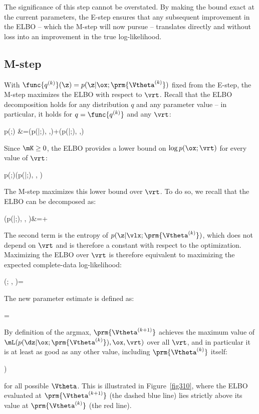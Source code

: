 The significance of this step cannot be overstated. By making the bound exact at the current parameters, the E-step ensures that any subsequent improvement in the ELBO -- which the M-step will now pursue -- translates directly and without loss into an improvement in the true log-likelihood.

\subsection*{M-step}

With $\func{q^{(k)}}(\z) = p(\z|\ox;\prm{\Vtheta^{(k)}})$ fixed from the E-step, the M-step maximizes the ELBO with respect to $\vrt$. Recall that the ELBO decomposition holds for any distribution $q$ and any parameter value -- in particular, it holds for $q = \func{q^{(k)}}$ and any $\vrt$:
\begin{myalign}
\log p(\ox ;\vrt)
&=\mL(p(\dz|\ox ;), \ox,\vrt)+\mK(p(\dz|\ox ;{}), \ox ,\vrt)
\end{myalign}
Since $\mK \geq 0$, the ELBO provides a lower bound on $\log p(\ox;\vrt)$ for every value of $\vrt$:
\begin{myequation}
\log p(\ox ;\vrt)\geq\mL(p(\dz|\ox ;{}), \ox, \vrt)
\end{myequation}
The M-step maximizes this lower bound over $\vrt$. To do so, we recall that the ELBO can be decomposed as:
\begin{myalign}
  \mL(p(\dz|\vlx ;), \vlx, \vrt)&=+
\end{myalign}
The second term is the entropy of $p(\z|\vlx;\prm{\Vtheta^{(k)}})$, which does not depend on $\vrt$ and is therefore a constant with respect to the optimization. Maximizing the ELBO over $\vrt$ is therefore equivalent to maximizing the expected complete-data log-likelihood:
\begin{myequation}
 (\vrt; {}, \vlx)=
\end{myequation}
The new parameter estimate is defined as:
\begin{myequation}
=
\end{myequation}
By definition of the argmax, $\prm{\Vtheta^{(k+1)}}$ achieves the maximum value of $\mL(p(\dz|\ox;\prm{\Vtheta^{(k)}}),\ox,\vrt)$ over all $\vrt$, and in particular it is at least as good as any other value, including $\prm{\Vtheta^{(k)}}$ itself:
\begin{myequation}
{)} 
\end{myequation}
for all possible $\Vtheta$. This is illustrated in Figure~\ref{fig310}, where the ELBO evaluated at $\prm{\Vtheta^{(k+1)}}$ (the dashed blue line) lies strictly above its value at $\prm{\Vtheta^{(k)}}$ (the red line).

